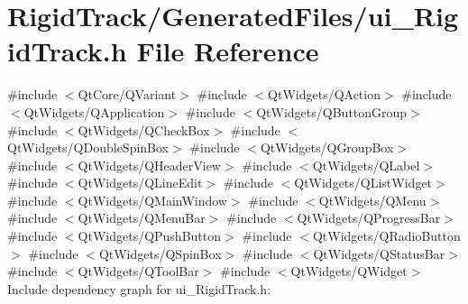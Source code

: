 \section{Rigid\+Track/\+Generated\+Files/ui\+\_\+\+Rigid\+Track.h File Reference}
\label{ui___rigid_track_8h}
{\ttfamily \#include $<$Qt\+Core/\+Q\+Variant$>$}\newline
{\ttfamily \#include $<$Qt\+Widgets/\+Q\+Action$>$}\newline
{\ttfamily \#include $<$Qt\+Widgets/\+Q\+Application$>$}\newline
{\ttfamily \#include $<$Qt\+Widgets/\+Q\+Button\+Group$>$}\newline
{\ttfamily \#include $<$Qt\+Widgets/\+Q\+Check\+Box$>$}\newline
{\ttfamily \#include $<$Qt\+Widgets/\+Q\+Double\+Spin\+Box$>$}\newline
{\ttfamily \#include $<$Qt\+Widgets/\+Q\+Group\+Box$>$}\newline
{\ttfamily \#include $<$Qt\+Widgets/\+Q\+Header\+View$>$}\newline
{\ttfamily \#include $<$Qt\+Widgets/\+Q\+Label$>$}\newline
{\ttfamily \#include $<$Qt\+Widgets/\+Q\+Line\+Edit$>$}\newline
{\ttfamily \#include $<$Qt\+Widgets/\+Q\+List\+Widget$>$}\newline
{\ttfamily \#include $<$Qt\+Widgets/\+Q\+Main\+Window$>$}\newline
{\ttfamily \#include $<$Qt\+Widgets/\+Q\+Menu$>$}\newline
{\ttfamily \#include $<$Qt\+Widgets/\+Q\+Menu\+Bar$>$}\newline
{\ttfamily \#include $<$Qt\+Widgets/\+Q\+Progress\+Bar$>$}\newline
{\ttfamily \#include $<$Qt\+Widgets/\+Q\+Push\+Button$>$}\newline
{\ttfamily \#include $<$Qt\+Widgets/\+Q\+Radio\+Button$>$}\newline
{\ttfamily \#include $<$Qt\+Widgets/\+Q\+Spin\+Box$>$}\newline
{\ttfamily \#include $<$Qt\+Widgets/\+Q\+Status\+Bar$>$}\newline
{\ttfamily \#include $<$Qt\+Widgets/\+Q\+Tool\+Bar$>$}\newline
{\ttfamily \#include $<$Qt\+Widgets/\+Q\+Widget$>$}\newline
Include dependency graph for ui\+\_\+\+Rigid\+Track.\+h\+:\nopagebreak
